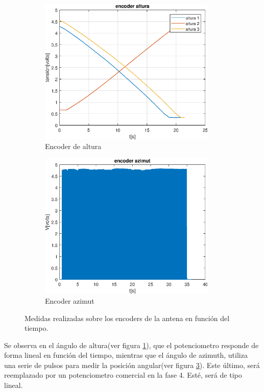 \begin{figure}[ht]
    \hspace{-10mm}
	\begin{subfigure}[t]{0.5\textwidth}
		\includegraphics[width=\textwidth,height=7cm]{medidas_cenit} 
		\caption{Encoder de altura} 
		\label{subfig:altura} 
	\end{subfigure}
	\hspace{10mm}	
	\begin{subfigure}[t]{0.5\textwidth}
		\includegraphics[width=\textwidth,height=7cm]{medidas_azimut}
		\caption{Encoder azimut}  
		\label{subfig:azimut} 
	\end{subfigure}
	\caption{Medidas realizadas sobre los encoders de la antena en función del tiempo.}
\end{figure}


Se observa en el ángulo de altura(ver figura \ref{subfig:altura}), que el potenciometro responde de forma lineal en función del tiempo, mientras que el ángulo de azimuth, utiliza una serie de pulsos para medir la posición angular(ver figura  \ref{subfig:azimut}). Este último, será reemplazado por un potenciometro comercial en la fase 4. Esté, será de tipo lineal. 

